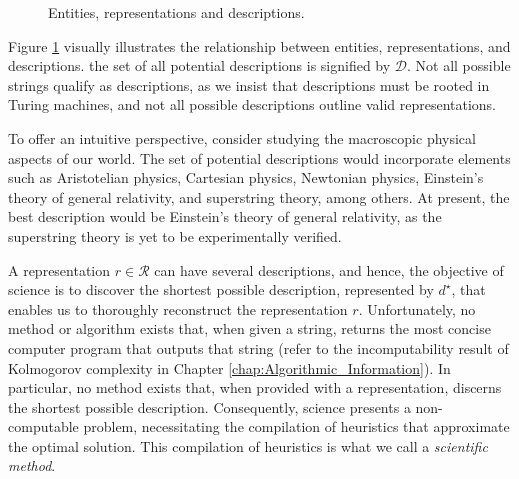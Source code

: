 \begin{figure}[t]
\centering
{}
\caption{\label{fig:entities_topics_models}Entities, representations and descriptions.}
\end{figure}

Figure \ref{fig:entities_topics_models} visually illustrates the relationship between entities, representations, and descriptions. the set of all potential descriptions is signified by $\mathcal{D}$. Not all possible strings qualify as descriptions, as we insist that descriptions must be rooted in Turing machines, and not all possible descriptions outline valid representations.

\begin{example}
To offer an intuitive perspective, consider studying the macroscopic physical aspects of our world. The set of potential descriptions would incorporate elements such as Aristotelian physics, Cartesian physics, Newtonian physics, Einstein's theory of general relativity, and superstring theory, among others. At present, the best description would be Einstein's theory of general relativity, as the superstring theory is yet to be experimentally verified.
\end{example}

A representation $r \in \mathcal{R}$ can have several descriptions, and hence, the objective of science is to discover the shortest possible description, represented by $d^\star$, that enables us to thoroughly reconstruct the representation $r$. Unfortunately, no method or algorithm exists that, when given a string, returns the most concise computer program that outputs that string (refer to the incomputability result of Kolmogorov complexity in Chapter \ref{chap:Algorithmic_Information}). In particular, no method exists that, when provided with a representation, discerns the shortest possible description. Consequently, science presents a non-computable problem, necessitating the compilation of heuristics that approximate the optimal solution. This compilation of heuristics is what we call a \emph{scientific method}.

